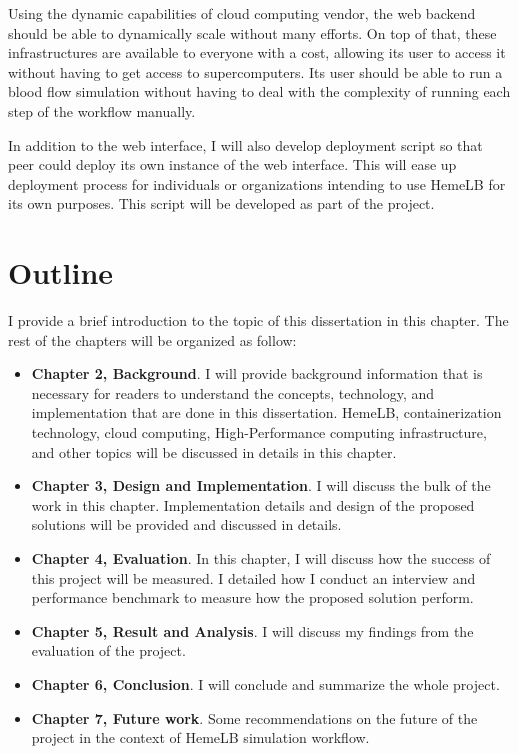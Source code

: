 Using the dynamic capabilities of cloud computing vendor, the web backend should be able to dynamically scale without many efforts. On top of that, these infrastructures are available to everyone with a cost, allowing its user to access it without having to get access to supercomputers. Its user should be able to run a blood flow simulation without having to deal with the complexity of running each step of the workflow manually.

In addition to the web interface, I will also develop deployment script so that peer could deploy its own instance of the web interface. This will ease up deployment process for individuals or organizations intending to use HemeLB for its own purposes. This script will be developed as part of the project.



\section{Outline}
I provide a brief introduction to the topic of this dissertation in this chapter. The rest of the chapters will be organized as follow:
\begin{itemize}
    \item \textbf{Chapter 2, Background}. I will provide background information that is necessary for readers to understand the concepts, technology, and implementation that are done in this dissertation. HemeLB, containerization technology, cloud computing, High-Performance computing infrastructure, and other topics will be discussed in details in this chapter.
    \item \textbf{Chapter 3, Design and Implementation}. I will discuss the bulk of the work in this chapter. Implementation details and design of the proposed solutions will be provided and discussed in details.
    \item \textbf{Chapter 4, Evaluation}. In this chapter, I will discuss how the success of this project will be measured. I detailed how I conduct an interview and performance benchmark to measure how the proposed solution perform.
    \item \textbf{Chapter 5, Result and Analysis}. I will discuss my findings from the evaluation of the project. 
    \item \textbf{Chapter 6, Conclusion}. I will conclude and summarize the whole project.
    \item \textbf{Chapter 7, Future work}. Some recommendations on the future of the project in the context of HemeLB simulation workflow.
\end{itemize}
